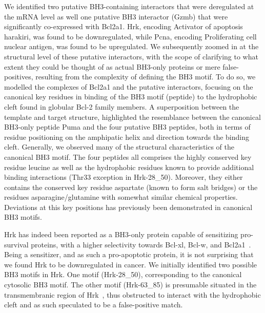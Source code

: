 \documentclass[10pt,letterpaper]{article}
\begin{document}
We identified two putative BH3-containing interactors that were deregulated at the mRNA level as well one putative BH3 interactor (Gzmb) that were significantly co-expressed with Bcl2a1. Hrk, encoding Activator of apoptosis harakiri, was found to be downregulated, while Pcna, encoding Proliferating cell nuclear antigen, was found to be upregulated.
We subsequently zoomed in at the structural level of these putative interactors, with the scope of clarifying to what extent they could be thought of as actual BH3-only proteins or mere false-positives, resulting from the complexity of defining the BH3 motif. To do so, we modelled the complexes of Bcl2a1 and the putative interactors, focusing on the canonical key residues in binding of the BH3 motif (peptide) to the hydrophobic cleft found in globular Bcl-2 family members.
A superposition between the template and target structure, highlighted the resemblance between the canonical BH3-only peptide Puma and the four putative BH3 peptides, both in terms of residue positioning on the amphipatic helix and direction towards the binding cleft. Generally, we observed many of the structural characteristics of the canonical BH3 motif. The four peptides all comprises the highly conserved key residue leucine as well as the hydrophobic residues known to provide additional binding interactions (Thr33 exception in Hrk-28\_50). Moreover, they either contains the conserved key residue aspartate (known to form salt bridges) or the residues asparagine/glutamine with somewhat similar chemical properties. Deviations at this key positions has previously been demonstrated in canonical BH3 motifs\cite{Zhang2003,Strappazzon2016}.

Hrk has indeed been reported as a BH3-only protein capable of sensitizing pro-survival proteins, with a higher selectivity towards Bcl-xl, Bcl-w, and Bcl2a1~\cite{Chen2005}. Being a sensitizer, and as such a pro-apoptotic protein, it is not surprising that we found Hrk to be downregulated in cancer. We initially identified two possible BH3 motifs in Hrk. One motif (Hrk-28\_50), corresponding to the canonical cytosolic BH3 motif. The other motif (Hrk-63\_85) is presumable situated in the transmembranic region of Hrk~\cite{Barrera-Vilarmau2011}, thus obstructed to interact with the hydrophobic cleft and as such speculated to be a false-positive match.
\end{document}
